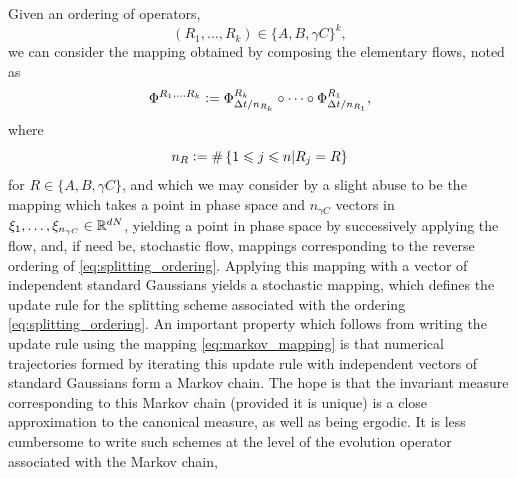 Given an ordering of operators, 
\begin{equation}\label{eq:splitting_ordering}(R_1,\dots,R_k)\in \{A,B,\gamma C\}^k,\end{equation}
we can consider the mapping obtained by composing the elementary flows, noted as
\begin{equation}\label{eq:markov_mapping}\Phi^{R_1,\dots R_k}\mathrel{\mathop:}=\Phi_{\Delta t/n_{R_k}}^{R_k}\circ\dots\circ\Phi_{\Delta t/n_{R_1}}^{R_1},
\end{equation}
where
$$n_R\mathrel{\mathop:}= \#\left\{1\leqslant j\leqslant n \middle| R_j=R\right\}$$
for $R\in\{A,B,\gamma C\}$, and which we may consider by a slight abuse to be the mapping which takes a point in phase space and $n_{\gamma C}$ vectors in $\xi_1,\dots,\xi_{n_{\gamma C}}\in\mathbb{R}^{dN}$, yielding a point in phase space by successively applying the flow, and, if need be, stochastic flow, mappings corresponding to the reverse ordering of \eqref{eq:splitting_ordering}.
Applying this mapping with a vector of independent standard Gaussians yields a stochastic mapping, which defines the update rule for the splitting scheme associated with the ordering \eqref{eq:splitting_ordering}.
An important property which follows from writing the update rule using the mapping \eqref{eq:markov_mapping} is that numerical trajectories formed by iterating this update rule with independent vectors of standard Gaussians form a Markov chain.
The hope is that the invariant measure corresponding to this Markov chain (provided it is unique) is a close approximation to the canonical measure, as well as being ergodic.
It is less cumbersome to write such schemes at the level of the evolution operator associated with the Markov chain,

